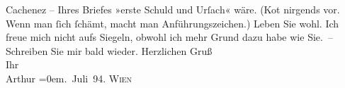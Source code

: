 \begin{ledgroupsized}[t]{13cm}
                    Cachenez – Ihres Briefes »erste Schuld und Urſach« wäre. (Ko{\geminationm}t nirgends vor. Wenn man ſich ſchämt, macht man
                    Anführungszeichen.)\pend
           \pstart
           Leben Sie wohl. Ich freue {\pb}mich nicht aufs
                    Siegeln, obwohl ich mehr Grund dazu habe wie Sie. –\pend
           \pstart
           Schreiben Sie mir bald wieder. Herzlichen Gruß{\\[\baselineskip]}Ihr{\\[\baselineskip]}\spacefill\mbox{Arthur}\pend
           \leftskip=0em{}. Juli 94. \textsc{Wien}\pend
           \endnumbering{}\end{ledgroupsized}  \newcommand{\dateiname}{L00343}\newcommand{\titel}{Arthur Schnitzler an Richard Beer-Hofmann, 2. 7. 1894}\newcommand{\editorInnen}{ Martin Anton Müller und Gerd-Hermann Susen}
      